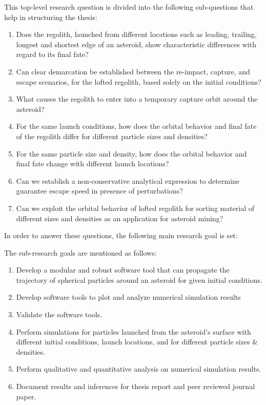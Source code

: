 \vspace{5mm}
This top-level research question is divided into the following sub-questions that help in structuring the thesis:
\begin{enumerate}
\item Does the regolith, launched from different locations such as leading, trailing, longest and shortest edge of an asteroid, show characteristic differences with regard to its final fate?
\item Can clear demarcation be established between the re-impact, capture, and escape scenarios, for the lofted regolith, based solely on the initial conditions?
\item What causes the regolith to enter into a temporary capture orbit around the asteroid?
\item For the same launch conditions, how does the orbital behavior and final fate of the regolith differ for different particle sizes and densities?
\item For the same particle size and density, how does the orbital behavior and final fate change with different launch locations?
\item Can we establish a non-conservative analytical expression to determine guarantee escape speed in presence of perturbations?
\item Can we exploit the orbital behavior of lofted regolith for sorting material of different sizes and densities as an application for asteroid mining?
\end{enumerate}

In order to answer these questions, the following main research goal is set:
\begin{center}
\end{center}
The sub-research goals are mentioned as follows:
\begin{enumerate}
\item Develop a modular and robust software tool that can propagate the trajectory of spherical particles around an asteroid for given initial conditions.
\item Develop software tools to plot and analyze numerical simulation results
\item Validate the software tools.
\item Perform simulations for particles launched from the asteroid's surface with different initial conditions, launch locations, and for different particle sizes \& densities.
\item Perform qualitative and quantitative analysis on numerical simulation results.
\item Document results and inferences for thesis report and peer reviewed journal paper.
\end{enumerate}
